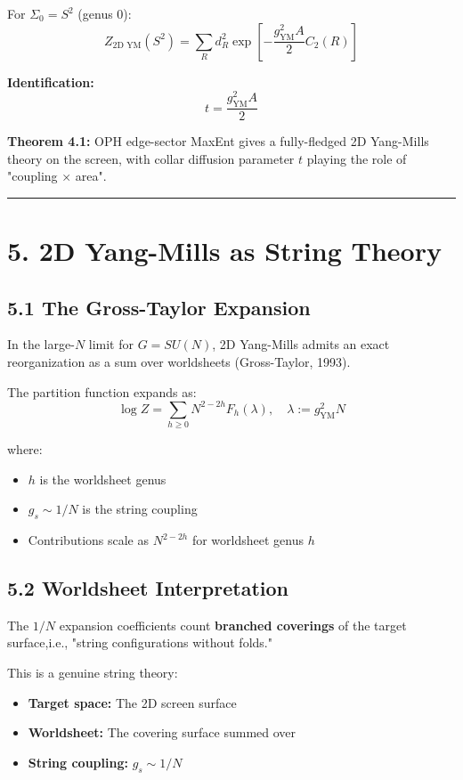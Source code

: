 For \(\Sigma_0 = S^2\) (genus 0): \[Z_{\text{2D YM}}(S^2) = \sum_R d_R^2 \exp\left[-\frac{g_{\text{YM}}^2 A}{2} C_2(R)\right]\]

\textbf{Identification:} \[t = \frac{g_{\text{YM}}^2 A}{2}\]

\textbf{Theorem 4.1:} OPH edge-sector MaxEnt gives a fully-fledged 2D Yang-Mills theory on the screen, with collar diffusion parameter \(t\) playing the role of "coupling × area".

\begin{center}\rule{0.5\linewidth}{0.5pt}\end{center}

\section{5. 2D Yang-Mills as String Theory}\label{5-2d-yang-mills-as-string-theory}

\subsection{5.1 The Gross-Taylor Expansion}\label{51-the-gross-taylor-expansion}

In the large-\(N\) limit for \(G = SU(N)\), 2D Yang-Mills admits an exact reorganization as a sum over worldsheets (Gross-Taylor, 1993).

The partition function expands as: \[\log Z = \sum_{h \geq 0} N^{2-2h} F_h(\lambda), \quad \lambda := g_{\text{YM}}^2 N\]

where:

\begin{itemize}
\tightlist
\item
  \(h\) is the worldsheet genus
\item
  \(g_s \sim 1/N\) is the string coupling
\item
  Contributions scale as \(N^{2-2h}\) for worldsheet genus \(h\)
\end{itemize}

\subsection{5.2 Worldsheet Interpretation}\label{52-worldsheet-interpretation}

The \(1/N\) expansion coefficients count \textbf{branched coverings} of the target surface,i.e., "string configurations without folds."

This is a genuine string theory:

\begin{itemize}
\tightlist
\item
  \textbf{Target space:} The 2D screen surface
\item
  \textbf{Worldsheet:} The covering surface summed over
\item
  \textbf{String coupling:} \(g_s \sim 1/N\)
\end{itemize}

